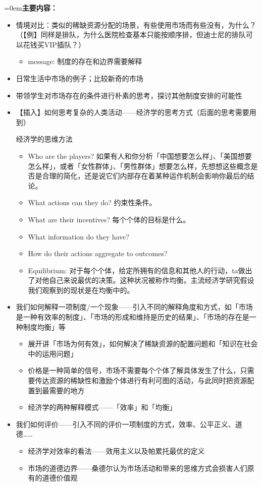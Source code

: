 \documentclass[10pt,a4paper]{ctexart}
\newcommand{\field}[1]{\par\noindent\hangindent=0em\textbf{#1}\hspace{0.2em}}
\begin{document}
\field{主要内容：}
\begin{itemize}
  \item 情境对比：类似的稀缺资源分配的场景，有些使用市场而有些没有，为什么？（【例】同样是排队，为什么医院检查基本只能按顺序排，但迪士尼的排队可以花钱买VIP插队？）
  \begin{itemize}
    \item message: 制度的存在和边界需要解释
  \end{itemize}
  \item 日常生活中市场的例子；比较新奇的市场
  \item 带领学生对市场存在的条件进行朴素的思考，探讨其他制度安排的可能性
  \item 【插入】如何思考复杂的人类活动——经济学的思考方式（后面的思考需要用到）
  \vspace{1em}
  \begin{conceptbox}{经济学的思维方法}
\begin{itemize}
    \item Who are the players? 如果有人和你分析「中国想要怎么样」、「美国想要怎么样」，或者「女性群体」、「男性群体」想要怎么样，先想想这些概念是否是合理的简化，还是说它们内部存在着某种运作机制会影响你最后的结论。
    \item What actions can they do? 约束性条件。
    \item What are their incentives? 每个个体的目标是什么。
    \item What information do they have?
    \item How do their actions aggregate to outcomes?
    \item Equilibrium: 对于每个个体，给定所拥有的信息和其他人的行动，ta做出了对他自己来说最优的决策。这种状况被称作均衡。主流经济学研究假设我们观察到的现状是在均衡中的。
\end{itemize}
\end{conceptbox}
  \item 我们如何解释一项制度/一个现象——引入不同的解释角度和方式，如「市场是一种有效率的制度」、「市场的形成和维持是历史的结果」、「市场的存在是一种制度均衡」等
  \begin{itemize}
    \item 展开讲「市场为何有效」，如何解决了稀缺资源的配置问题和「知识在社会中的运用问题」
    \item 价格是一种简单的信号，市场不需要每个个体了解具体发生了什么，只需要传达资源的稀缺性和激励个体进行有利可图的活动，与此同时把资源配置到最需要的地方
    \item 经济学的两种解释模式——「效率」和「均衡」
  \end{itemize}
  \item 我们如何评价——引入不同的评价一项制度的方式，效率、公平正义、道德……
  \begin{itemize}
    \item 经济学对效率的看法——效用主义以及帕累托最优的定义
    \item 市场的道德边界——桑德尔认为市场活动和带来的思维方式会损害人们原有的道德价值观
  \end{itemize}

\end{itemize}
\end{document}
